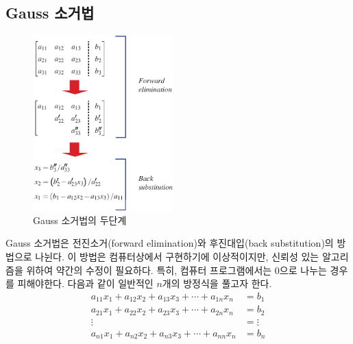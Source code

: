 \subsection{Gauss 소거법}
\begin{figure}
\centering
\includegraphics[keepaspectratio=true,width=0.48\textwidth]{figs2/p8-3.eps}
\caption{Gauss 소거법의 두단계}
\label{fig:8-3}
\end{figure}
Gauss 소거법은 전진소거(forward elimination)와 후진대입(back substitution)의 방법으로 나뉜다. 이 방법은 컴퓨터상에서 구현하기에 이상적이지만, 신뢰성 있는 알고리즘을 위하여 약간의 수정이 필요하다. 특히, 컴퓨터 프로그램에서는 0으로 나누는 경우를 피해야한다. 
다음과 같이 일반적인 $n$개의 방정식을 풀고자 한다.
\begin{align}
a_{11}x_{1}+a_{12}x_{2}+a_{13}x_{3}+\cdots+a_{1n}x_{n}&=b_{1}\label{eq:8-12a}\\
a_{21}x_{1}+a_{22}x_{2}+a_{23}x_{3}+\cdots+a_{2n}x_{n}&=b_{2}\label{eq:8-12b}\\
\vdots\qquad{}&=\vdots\nonumber\\
a_{n1}x_{1}+a_{n2}x_{2}+a_{n3}x_{3}+\cdots+a_{nn}x_{n}&=b_{n}\label{eq:8-12c}
\end{align}
